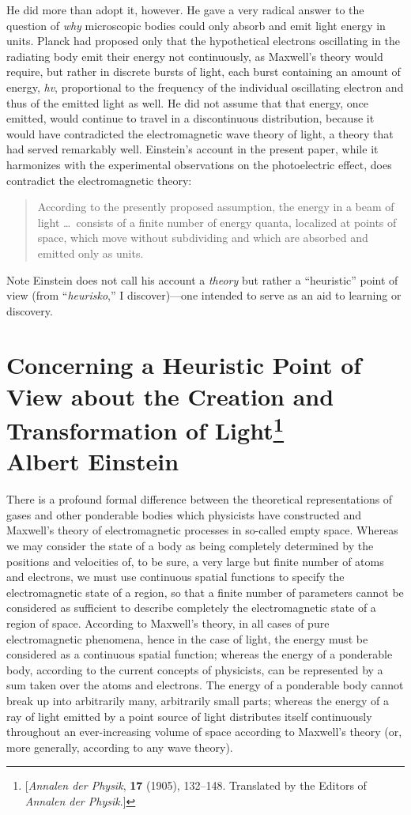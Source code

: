 He did more than adopt it, however. He gave a very radical answer to the
question of \emph{why} microscopic bodies could only absorb and emit
light energy in units. Planck had proposed only that the hypothetical
electrons oscillating in the radiating body emit their energy not
continuously, as Maxwell's theory would require, but rather in discrete
bursts of light, each burst containing an amount of energy, \emph{hv},
proportional to the frequency of the individual oscillating electron and
thus of the emitted light as well. He did not assume that that energy,
once emitted, would continue to travel in a discontinuous distribution,
because it would have contradicted the electromagnetic wave theory of
light, a theory that had served remarkably well. Einstein's account in
the present paper, while it harmonizes with the experimental
observations on the photoelectric effect, does contradict the
electromagnetic theory:
\begin{quote}
According to the presently proposed assumption, the energy in a beam of
light \ldots\ consists of a finite number of energy quanta, localized at
points of space, which move without subdividing and which are absorbed
and emitted only as units.
\end{quote}

Note Einstein does not call his account a \emph{theory} but rather a
``heuristic'' point of view (from ``\emph{heurisko},'' I discover)---one
intended to serve as an aid to learning or discovery.

\newpage
\section*{Concerning a Heuristic Point of View about the
Creation and Transformation of Light\footnote{{[}\emph{Annalen der
  Physik}, \textbf{17} (1905), 132--148. Translated by the Editors of
  \emph{Annalen der Physik}.{]}}\\
  {\large Albert Einstein}}

There is a profound formal difference between the theoretical
representations of gases and other ponderable bodies which physicists
have constructed and Maxwell's theory of electromagnetic processes in
so-called empty space. Whereas we may consider the state of a body as
being completely determined by the positions and velocities of, to be
sure, a very large but finite number of atoms and electrons, we must use
continuous spatial functions to specify the electromagnetic state of a
region, so that a finite number of parameters cannot be considered as
sufficient to describe completely the electromagnetic state of a region
of space. According to Maxwell's theory, in all cases of pure
electromagnetic phenomena, hence in the case of light, the energy must
be considered as a continuous spatial function; whereas the energy of a
ponderable body, according to the current concepts of physicists, can be
represented by a sum taken over the atoms and electrons. The energy of a
ponderable body cannot break up into arbitrarily many, arbitrarily small
parts; whereas the energy of a ray of light emitted by a point source of
light distributes itself continuously throughout an ever-increasing
volume of space according to Maxwell's theory (or, more generally,
according to any wave theory).

